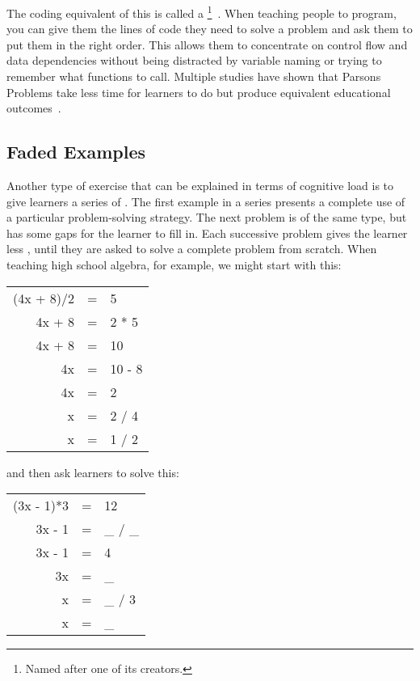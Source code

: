 The coding equivalent of this
is called a \footnote{Named after one of its creators.}~\cite{Pars2006}.
When teaching people to program,
you can give them the lines of code they need to solve a problem
and ask them to put them in the right order.
This allows them to concentrate on control flow and data dependencies
without being distracted by variable naming or trying to remember what functions to call.
Multiple studies have shown that Parsons Problems take less time for learners to do
but produce equivalent educational outcomes~\cite{Eric2017}.

\subsection*{Faded Examples}

Another type of exercise that can be explained in terms of cognitive load
is to give learners a series of .
The first example in a series presents a complete use of a particular problem-solving strategy.
The next problem is of the same type,
but has some gaps for the learner to fill in.
Each successive problem gives the learner less ,
until they are asked to solve a complete problem from scratch.
When teaching high school algebra,
for example,
we might start with this:

\begin{center}
\begin{tabular}{rcl}
  (4x + 8)/2	& = &	5	\\
  4x + 8	& = &	2 * 5	\\
  4x + 8	& = &	10	\\
  4x		& = &	10 - 8	\\
  4x		& = &	2	\\
  x		& = &	2 / 4	\\
  x		& = &	1 / 2
\end{tabular}
\end{center}

\noindent
and then ask learners to solve this:

\begin{center}
\begin{tabular}{rcl}
  (3x - 1)*3	& = &	12	\\
  3x - 1	& = &	\_ / \_	\\
  3x - 1	& = &	4	\\
  3x		& = &	\_	\\
  x		& = &	\_ / 3	\\
  x		& = &	\_
\end{tabular}
\end{center}

